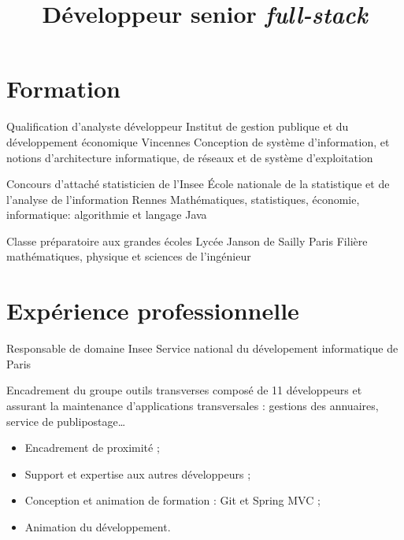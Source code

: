 \documentclass[11pt,a4paper,roman]{moderncv}       %
\title{Développeur senior \emph{full-stack}}
\begin{document}
\makecvtitle

\section{Formation}\label{sec:formation}

{Qualification d'analyste développeur}
{Institut de gestion publique et du développement économique}
{Vincennes}
{}
{Conception de système d'information, et notions d'architecture informatique, de réseaux et de système d'exploitation}

{Concours d'attaché statisticien de l'Insee}
{École nationale de la statistique et de l'analyse de l'information}
{Rennes}
{}
{Mathématiques, statistiques, économie, informatique: algorithmie et langage Java}

{Classe préparatoire aux grandes écoles}
{Lycée Janson de Sailly}
{Paris}
{}
{Filière mathématiques, physique et sciences de l'ingénieur}

\section{Expérience professionnelle}\label{sec:expérience-professionnelle}
{Responsable de domaine}
{Insee}
{Service national du dévelopement informatique de Paris}
{}
{Encadrement du groupe \og outils transverses \fg composé de 11 développeurs et assurant la maintenance d'applications transversales : gestions des annuaires, service de publipostage\ldots
\begin{itemize}%
  \item Encadrement de proximité ;
  \item Support et expertise aux autres développeurs ;
  \item Conception et animation de formation : Git et Spring MVC ;
  \item Animation du développement.
\end{itemize}}
\end{document}
